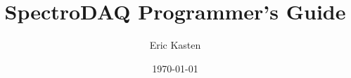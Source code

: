 \title{SpectroDAQ Programmer's Guide}
\author{Eric Kasten
   \address{National Superconducting Cyclotron Laboratory\\  
            Michigan State University \\  
            East Lansing, Michigan 48824 \\
			kasten@nscl.msu.edu}
}
\date{\today}
